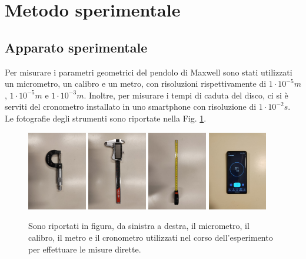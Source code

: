 \documentclass{article}
\begin{document}
\section{Metodo sperimentale}
\subsection{Apparato sperimentale}
Per misurare i parametri geometrici del pendolo di Maxwell sono stati utilizzati un micrometro, un calibro e un metro, con risoluzioni rispettivamente di $ 1 \cdot 10^{-5} m $, $ 1 \cdot 10^{-5} m $ e $ 1 \cdot 10^{-3} m $. Inoltre, per misurare i tempi di caduta del disco, ci si è serviti del cronometro installato in uno smartphone con risoluzione di $ 1 \cdot 10^{-2} s $. Le fotografie degli strumenti sono riportate nella Fig. \ref{strumenti}.

\begin{figure}[h!]
\centering
\includegraphics[width=0.23\textwidth]{micrometro}
\hspace{2pt}
\includegraphics[width=0.23\textwidth]{calibro}
\hspace{2pt}
\includegraphics[width=0.23\textwidth]{metro}
\hspace{2pt}
\includegraphics[width=0.23\textwidth]{cronometro}
\caption{Sono riportati in figura, da sinistra a destra, il micrometro, il calibro, il metro e il cronometro utilizzati nel corso dell'esperimento per effettuare le misure dirette.}
\label{strumenti}
\end{figure}
\end{document}
